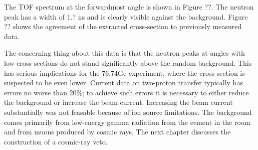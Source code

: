 
The TOF spectrum at the forwardmost angle is shown in Figure ??.  The neutron peak has a width of 1.? ns and is clearly visible against the background.  Figure ?? shows the agreement of the extracted cross-section to previously measured data.



The concerning thing about this data is that the neutron peaks at angles with low cross-sections do not stand significantly above the random background.  This has serious implications for the 76,74Ge experiment, where the cross-section is suspected to be even lower.  Current data on two-proton transfer typically has errors no worse than 20\%; to achieve such errors it is necessary to either reduce the background or increase the beam current.  Increasing the beam current substantially was not feasable because of ion source limitations.  The background comes primarily from low-energy gamma radiation from the cement in the room and from muons produced by cosmic rays.  The next chapter discusses the construction of a cosmic-ray veto.

%
% 
% 
